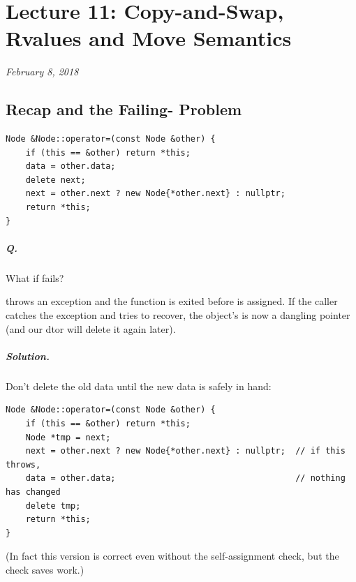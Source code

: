\chapter{Lecture 11: Copy-and-Swap, Rvalues and Move Semantics}
\begin{center}
\textit{February 8, 2018}
\end{center}

\section{Recap and the Failing- Problem}
\begin{lstlisting}[style=cpp]
Node &Node::operator=(const Node &other) {
    if (this == &other) return *this;
    data = other.data;
    delete next;
    next = other.next ? new Node{*other.next} : nullptr;
    return *this;
}
\end{lstlisting}

\paragraph{Q.} What if  fails?

 throws an exception and the function is exited before  is
assigned. If the caller catches the exception and tries to recover, the object's
 is now a dangling pointer (and our dtor will delete it again later).

\paragraph{Solution.} Don't delete the old data until the new data is safely in
hand:
\begin{lstlisting}[style=cpp]
Node &Node::operator=(const Node &other) {
    if (this == &other) return *this;
    Node *tmp = next;
    next = other.next ? new Node{*other.next} : nullptr;  // if this throws,
    data = other.data;                                    // nothing has changed
    delete tmp;
    return *this;
}
\end{lstlisting}
(In fact this version is correct even without the self-assignment check, but the
check saves work.)

